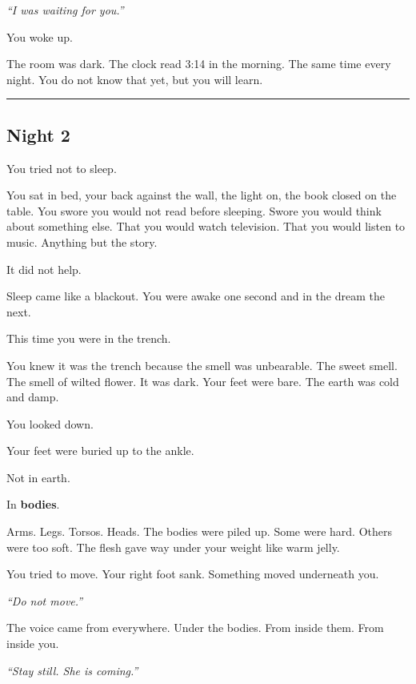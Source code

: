 \noindent \textit{\textquotedblleft{}I was waiting for you.\textquotedblright{}}

\noindent You woke up.

\noindent The room was dark. The clock read 3:14 in the morning. The same time every night. You do not know that yet, but you will learn.

\vspace{0.5em}\noindent\rule{\textwidth}{0.5pt}\vspace{0.5em}

\subsection*{Night 2}

\noindent You tried not to sleep.

\noindent You sat in bed, your back against the wall, the light on, the book closed on the table. You swore you would not read before sleeping. Swore you would think about something else. That you would watch television. That you would listen to music. Anything but the story.

\noindent It did not help.

\noindent Sleep came like a blackout. You were awake one second and in the dream the next.

\noindent This time you were in the trench.

\noindent You knew it was the trench because the smell was unbearable. The sweet smell. The smell of wilted flower. It was dark. Your feet were bare. The earth was cold and damp.

\noindent You looked down.

\noindent Your feet were buried up to the ankle.

\noindent Not in earth.

\noindent In \textbf{bodies}.

\noindent Arms. Legs. Torsos. Heads. The bodies were piled up. Some were hard. Others were too soft. The flesh gave way under your weight like warm jelly.

\noindent You tried to move. Your right foot sank. Something moved underneath you.

\noindent \textit{\textquotedblleft{}Do not move.\textquotedblright{}}

\noindent The voice came from everywhere. Under the bodies. From inside them. From inside you.

\noindent \textit{\textquotedblleft{}Stay still. She is coming.\textquotedblright{}}

